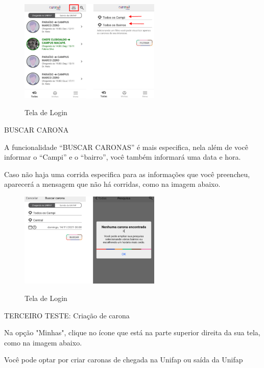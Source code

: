 \begin{figure}[H]
	\centering
	\caption{Tela de Login}
	\includegraphics[width=0.6\textwidth]{./04-figuras/manual/filtrar_carona.png}
	\label{fig:filtrar_carona_2}
\end{figure}

BUSCAR CARONA

A funcionalidade “BUSCAR CARONAS” é mais especifica, nela além de você informar o “Campi” e o “bairro”, você também informará uma data e hora.

Caso não haja uma corrida especifica para as informações que você preencheu, aparecerá a mensagem que não há corridas, como na imagem abaixo.

\begin{figure}[H]
	\centering
	\caption{Tela de Login}
	\includegraphics[width=0.6\textwidth]{./04-figuras/manual/buscar_carona.png}
	\label{fig:buscar_carona}
\end{figure}

TERCEIRO TESTE: Criação de carona

Na opção "Minhas", clique no ícone que está na parte superior direita da sua tela, como na imagem abaixo.

Você pode optar por criar caronas de chegada na Unifap ou saída da Unifap

